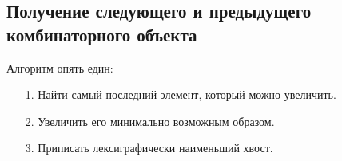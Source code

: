 \subsection{Получение следующего и предыдущего комбинаторного объекта}
Алгоритм опять един:
\begin{enumerate}
    \item[1.] Найти самый последний элемент, который можно увеличить.
    \item[2.] Увеличить его минимально возможным образом.
    \item[3.] Приписать лексиграфически наименьший хвост.
    
\end{enumerate}

    